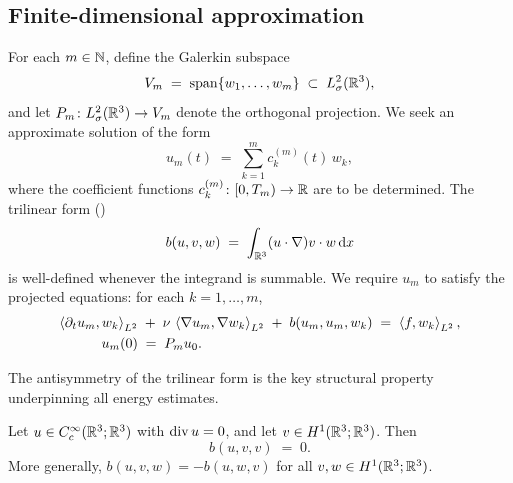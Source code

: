 \subsection{Finite-dimensional approximation}

For each $m \in \mathbb{N}$, define the Galerkin subspace
\begin{equation}\label{eq:galerkin-subspace}
  V_{m}
  \;=\;
  \operatorname{span}\{w_{1}, \ldots, w_{m}\}
  \;\subset\;
  L^{2}_\sigma(\mathbb{R}^{3}),
\end{equation}
and let $P_{m} \colon L^{2}_\sigma(\mathbb{R}^{3}) \to V_{m}$ denote the orthogonal projection.
We seek an approximate solution of the form
\begin{equation}\label{eq:galerkin-ansatz}
  u_{m}(t)
  \;=\;
  \sum_{k=1}^{m} c_{k}^{(m)}(t)\,w_{k},
\end{equation}
where the coefficient functions $c_{k}^{(m)} \colon [0, T_{m}) \to \mathbb{R}$ are to be
determined.  The trilinear form ()
\begin{equation}\label{eq:trilinear-form}
  b(u, v, w)
  \;=\;
  \int_{\mathbb{R}^{3}} (u \cdot \nabla) v \cdot w \,\mathrm{d} x
\end{equation}
is well-defined whenever the integrand is summable.  We require $u_{m}$ to satisfy
the projected equations: for each $k = 1, \ldots, m$,
\begin{align}\label{eq:galerkin-ode}
  \left\langle \partial_{t} u_{m}, w_{k} \right\rangle_{L^{2}}
  &\;+\;
  \nu\,\left\langle \nabla u_{m}, \nabla w_{k} \right\rangle_{L^{2}}
  \;+\;
  b(u_{m}, u_{m}, w_{k})
  \;=\;
  \left\langle f, w_{k} \right\rangle_{L^{2}}, \notag \\
  u_{m}(0) &\;=\; P_{m} u_{0}.
\end{align}

The antisymmetry of the trilinear form is the key structural property underpinning
all energy estimates.

\begin{lemma}%
  \label{lem:trilinear-antisymmetry}
  Let $u \in C^\infty_c(\mathbb{R}^{3}; \mathbb{R}^{3})$ with $\operatorname{div} u = 0$, and let
  $v \in H^{1}(\mathbb{R}^{3}; \mathbb{R}^{3})$.  Then
  \begin{equation}\label{eq:trilinear-antisymmetry}
    b(u, v, v) \;=\; 0.
  \end{equation}
  More generally, $b(u, v, w) = -b(u, w, v)$ for all
  $v, w \in H^{1}(\mathbb{R}^{3}; \mathbb{R}^{3})$.
\end{lemma}

